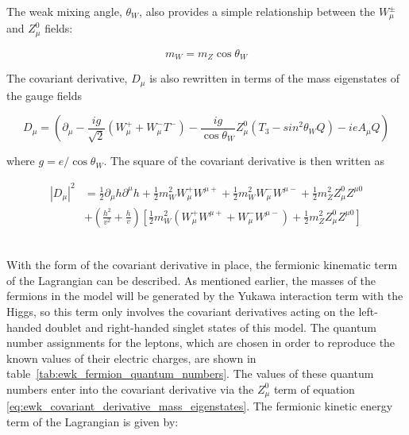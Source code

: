 \noindent The weak mixing angle, $\theta_{W}$, also provides a
simple relationship between the $W_{\mu}^{\pm}$ and $Z_{\mu}^{0}$
fields:

\begin{equation}\label{eq:ewk_mz_is_mwcosthetaW}
m_{W} = m_{Z}\cos{\theta_{W}}
\end{equation}

\noindent The covariant derivative, $D_{\mu}$ is also rewritten in
terms of the mass eigenstates of the gauge fields

\begin{equation}\label{eq:ewk_covariant_derivative_mass_eigenstates}
D_{\mu} = (\partial_{\mu} - \frac{ig}{\sqrt{2}}(W_{\mu}^{+} +
W_{\mu}^{-}T^{-}) -
\frac{ig}{\cos{\theta_{W}}}Z_{\mu}^{0}(T_{3}-sin^{2}{\theta_{W}}Q) -
ieA_{\mu}Q)
\end{equation}

\noindent where $g = e/\cos{\theta_{W}}$.  The square of the covariant
derivative is then written as

\begin{equation}\label{eq:ewk_covariant_derivative_squared_mass_eigenstates}
\begin{aligned}
|D_{\mu}|^{2} &= \frac{1}{2}\partial_{\mu}h\partial^{\mu}h +
\frac{1}{2}m_{W}^{2}W_{\mu}^{+}W^{\mu+} +
\frac{1}{2}m_{W}^{2}W_{\mu}^{-}W^{\mu-} +
\frac{1}{2}m_{Z}^{2}Z_{\mu}^{0}Z^{\mu0} \\
& + (\frac{h^{2}}{v^{2}} + \frac{h}{v})[
    \frac{1}{2}m_{W}^{2}(W_{\mu}^{+}W^{\mu+}+W_{\mu}^{-}W^{\mu-}) +
    \frac{1}{2}m_{Z}^{2}Z_{\mu}^{0}Z^{\mu0}]
\end{aligned}
\end{equation} 
\\
\par With the form of the covariant derivative in place, the
fermionic kinematic term of the Lagrangian can be described.  As
mentioned earlier, the masses of the fermions in the model will be
generated by the Yukawa interaction term with the Higgs, so this
term only involves the covariant derivatives acting on the left-handed
doublet and right-handed singlet states of this model.  The quantum
number assignments for the leptons, which are chosen in order to
reproduce the known values of their electric charges, are shown in
table~\ref{tab:ewk_fermion_quantum_numbers}. The values  of these
quantum numbers enter into the covariant derivative via the
$Z_{\mu}^{0}$ term of equation
\ref{eq:ewk_covariant_derivative_mass_eigenstates}.  The fermionic
kinetic energy term of the Lagrangian is given by: 


